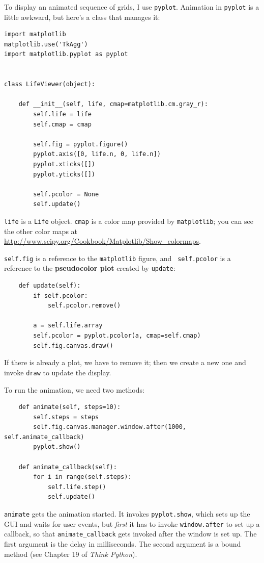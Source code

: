\documentclass[10pt]{book}
\begin{document}
To display an animated sequence of grids, I use {\tt pyplot}.
Animation in {\tt pyplot} is a little awkward, but here's a class
that manages it:

\begin{verbatim}
import matplotlib
matplotlib.use('TkAgg')
import matplotlib.pyplot as pyplot


class LifeViewer(object):

    def __init__(self, life, cmap=matplotlib.cm.gray_r):
        self.life = life
        self.cmap = cmap

        self.fig = pyplot.figure()
        pyplot.axis([0, life.n, 0, life.n])
        pyplot.xticks([])
        pyplot.yticks([])

        self.pcolor = None
        self.update()
\end{verbatim}

{\tt life} is a {\tt Life} object.  {\tt cmap} is a color map
provided by {\tt matplotlib}; you can see the other
color maps at \url{http://www.scipy.org/Cookbook/Matplotlib/Show_colormaps}.

{\tt self.fig} is a reference to the {\tt matplotlib} figure, and {\tt
  self.pcolor} is a reference to the {\bf pseudocolor plot} created by
{\tt update}:

\begin{verbatim}
    def update(self):
        if self.pcolor:
            self.pcolor.remove()

        a = self.life.array
        self.pcolor = pyplot.pcolor(a, cmap=self.cmap)
        self.fig.canvas.draw()
\end{verbatim}

If there is already a plot, we have to remove it; then we create
a new one and invoke {\tt draw} to update the display.

To run the animation, we need two methods:

\begin{verbatim}
    def animate(self, steps=10):
        self.steps = steps
        self.fig.canvas.manager.window.after(1000, self.animate_callback)
        pyplot.show()

    def animate_callback(self):
        for i in range(self.steps):
            self.life.step()
            self.update()
\end{verbatim}

{\tt animate} gets the animation started.  It invokes {\tt pyplot.show},
which sets up the GUI and waits for user events, but {\em first} it has
to invoke {\tt window.after} to set up a callback, so that
\verb"animate_callback" gets invoked after the window is set up.
The first argument is the delay in milliseconds.  The second
argument is a bound method (see Chapter 19 of {\em Think Python}).
\end{document}
